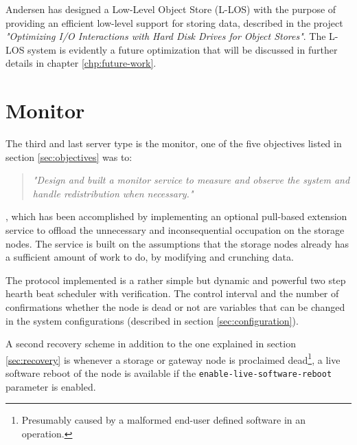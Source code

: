 Andersen has designed a Low-Level Object Store (L-LOS) with the purpose of providing an efficient low-level support for storing data, described in the project \textit{"Optimizing I/O Interactions with Hard Disk Drives for Object Stores"}\cite{andersen2016}. The L-LOS system is evidently a future optimization that will be discussed in further details in chapter \ref{chp:future-work}. 

\section{Monitor} \label{sec:monitor}
The third and last server type is the monitor, one of the five objectives listed in section \ref{sec:objectives} was to:

\begin{quotation}
	\textit{"Design and built a monitor service to measure and observe the system and handle redistribution when necessary."}
\end{quotation}

, which has been accomplished by implementing an optional pull-based extension service to offload the unnecessary and inconsequential 	occupation on the storage nodes. The service is built on the assumptions that the storage nodes already has a sufficient amount of work to do, by modifying and crunching data.
\newline

The protocol implemented is a rather simple but dynamic and powerful two step hearth beat scheduler with verification. The control interval and the number of confirmations whether the node is dead or not are variables that can be changed in the system configurations (described in section \ref{sec:configuration}). 

A second recovery scheme in addition to the one explained in section \ref{sec:recovery} is whenever a storage or gateway node is proclaimed dead\footnote{Presumably caused by a malformed end-user defined software in an operation.}, a live software reboot of the node is available if the \texttt{enable-live-software-reboot} parameter is enabled.
